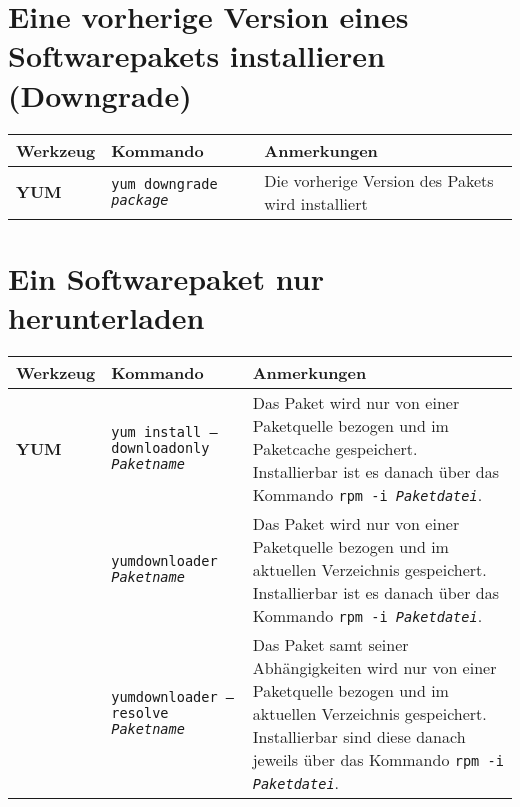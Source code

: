 \documentclass[10pt,a4paper]{article}
\begin{document}
\section{Eine vorherige Version eines Softwarepakets installieren (Downgrade)}
\begin{tabular}{ p{3.5cm} p{9cm} p{11cm}}
  \hline
  \rowcolor{Gray}
  \textbf{Werkzeug} & \textbf{Kommando} & \textbf{Anmerkungen} \\
  \hline 
  \textbf{YUM} & \texttt{yum downgrade \textit{package}} & Die vorherige Version des Pakets wird installiert \\
  \hline
\end{tabular}

\section{Ein Softwarepaket nur herunterladen}
\begin{tabular}{ p{3.5cm} p{9cm} p{11cm}}
  \hline
  \rowcolor{Gray}
  \textbf{Werkzeug} & \textbf{Kommando} & \textbf{Anmerkungen} \\
  \hline 
  \textbf{YUM} & \texttt{yum install --downloadonly \textit{Paketname}} & Das Paket wird nur von einer Paketquelle bezogen und im Paketcache gespeichert. Installierbar ist es danach über das Kommando \texttt{rpm -i \textit{Paketdatei}}.\\
  \rowcolor{Gray}
  & \texttt{yumdownloader \textit{Paketname}} & Das Paket wird nur von einer Paketquelle bezogen und im aktuellen Verzeichnis gespeichert. Installierbar ist es danach über das Kommando \texttt{rpm -i \textit{Paketdatei}}.\\
  & \texttt{yumdownloader --resolve \textit{Paketname}} & Das Paket samt seiner Abhängigkeiten wird nur von einer Paketquelle bezogen und im aktuellen Verzeichnis gespeichert. Installierbar sind diese danach jeweils über das Kommando \texttt{rpm -i \textit{Paketdatei}}.\\
  \hline
\end{tabular}
\end{document}
